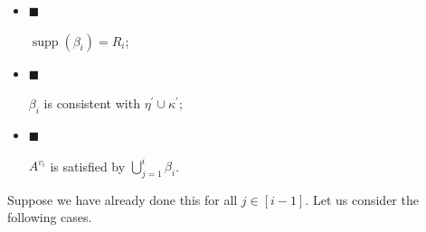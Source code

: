 \documentclass[10pt,a4paper]{article}
\begin{document}
\begin{itemize}


\item[] 
$\blacksquare$ 


$\operatorname*{supp}(\beta_{i})=R_{i}$;\par





\item[] 
$\blacksquare$ 


$\beta_{i}$ is consistent with $\eta^{\prime}\cup\kappa^{\prime}$;\par





\item[] 
$\blacksquare$ 


$A^{v_{i}}$ is satisfied by $\bigcup\limits_{j=1}^{i}\beta_{i}$.\par





\end{itemize}


Suppose we have already done this for all $j\in[i-1]$. Let us consider the following cases.\par
\end{document}
